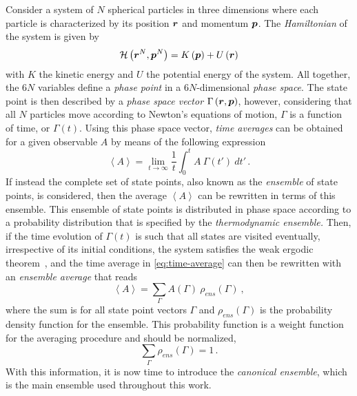 Consider a system of $N$ spherical particles in three dimensions
where each particle is characterized by its position $\bm{r}$ and momentum $\bm{p}$.
The \emph{Hamiltonian} of the system is given by
\begin{equation}
    \mathcal{H} \left( \bm{r}^{N}, \bm{p}^{N} \right) = 
    K \left( \bm{p} \right) + U \left( \bm{r} \right)
    \label{eq:hamiltonian}
\end{equation}
with $K$ the kinetic energy and $U$ the potential energy of the system.
All together, the 6$N$ variables define a \emph{phase point} in a 6$N$-dimensional
\emph{phase space}. The state point is then described by a
\emph{phase space vector} $\Gamma \left( \bm{r}, \bm{p} \right)$, however, considering that all
$N$ particles move according to Newton's equations of motion, $\Gamma$ is
a function of time, or $\Gamma(t)$. Using this phase space vector, \emph{time averages}
can be obtained for a given observable $A$ by means of the following expression
\begin{equation}
    \left< A \right> = \lim_{t \to \infty} \frac{1}{t} 
    \int_{0}^{t} A \: \Gamma(t') \: dt' \, .
    \label{eq:time-average}
\end{equation}
If instead the complete set of state points, also known as the \emph{ensemble} of state
points, is considered, then the average $\left< A \right>$ can be rewritten in
terms of this ensemble.
This ensemble of state points is distributed in phase space according to a probability 
distribution that is specified by the \emph{thermodynamic ensemble.} Then, if the time 
evolution of $\Gamma(t)$ is such that all states are visited eventually, irrespective of 
its initial conditions, the system satisfies the weak ergodic
theorem~\cite{kittelElementaryStatisticalPhysics2004},
and the time average in \autoref{eq:time-average} can then be rewritten with an
\emph{ensemble average} that reads
\begin{equation}
    \left< A \right> = \sum_{\Gamma} A(\Gamma) \: \rho_{ens} (\Gamma)
    \: ,
    \label{eq:ensemble-average}
\end{equation}
where the sum is for all state point vectors $\Gamma$ and $\rho_{ens} (\Gamma)$
is the probability density function for the ensemble. This probability function is
a weight function for the averaging procedure and should be normalized,
\begin{equation}
    \sum_{\Gamma} \rho_{ens} (\Gamma) = 1 \, .
    \label{eq:normalized}
\end{equation}
With this information, it is now time to introduce the \emph{canonical ensemble}, which
is the main ensemble used throughout this work.

